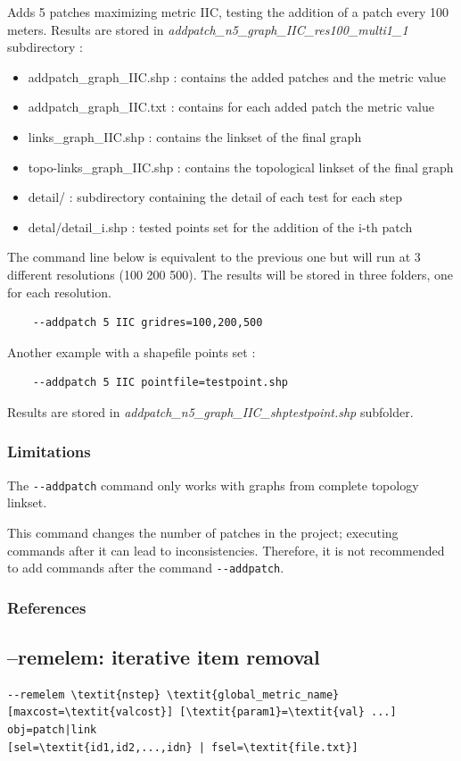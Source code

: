 \documentclass[a4paper,10pt]{report}
\begin{document}
Adds 5 patches maximizing metric IIC, testing the addition of a patch every 100 meters.
Results are stored in \textit{addpatch\_n5\_graph\_IIC\_res100\_multi1\_1} subdirectory :
\begin{itemize}
 \item addpatch\_graph\_IIC.shp : contains the added patches and the metric value 
 \item addpatch\_graph\_IIC.txt : contains for each added patch the metric value 
 \item links\_graph\_IIC.shp : contains the linkset of the final graph
 \item topo-links\_graph\_IIC.shp : contains the topological linkset of the final graph
 \item detail/ : subdirectory containing the detail of each test for each step
 \item detal/detail\_i.shp : tested points set for the addition of the i-th patch 
\end{itemize}


The command line below is equivalent to the previous one but will run at 3 different resolutions (100 200 500). The results will be stored in three folders, one for each resolution.
\begin{Verbatim}
	--addpatch 5 IIC gridres=100,200,500
\end{Verbatim}

Another example with a shapefile points set :
\begin{Verbatim}
	--addpatch 5 IIC pointfile=testpoint.shp
\end{Verbatim}
Results are stored in \textit{addpatch\_n5\_graph\_IIC\_shptestpoint.shp} subfolder.

\subsubsection{Limitations}
The \verb|--addpatch| command only works with graphs from complete topology linkset.

This command changes the number of patches in the project; executing commands after it can lead to inconsistencies.
Therefore, it is not recommended to add commands after the command \verb|--addpatch|.

\subsubsection{References}
\cite{2015_addpatch_rainette, 2014_LUP}


\subsection{--remelem: iterative item removal}
\begin{Verbatim}[commandchars=\\\{\}]
--remelem \textit{nstep} \textit{global_metric_name} [maxcost=\textit{valcost}] [\textit{param1}=\textit{val} ...] obj=patch|link
[sel=\textit{id1,id2,...,idn} | fsel=\textit{file.txt}]
\end{Verbatim}
\end{document}
